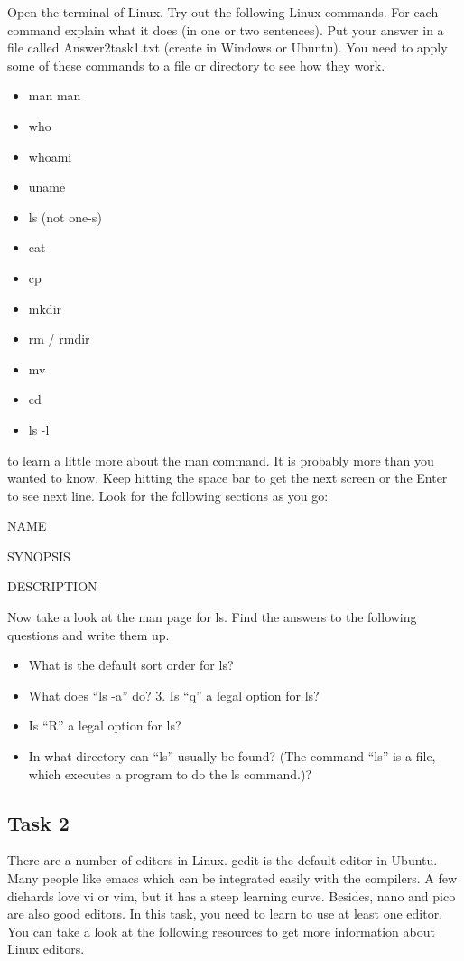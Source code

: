 \documentclass[16pt]{article}
\begin{document}
Open the terminal of Linux. Try out the following Linux commands. For each command explain what it does (in one or two sentences). Put your answer in a file called Answer2task1.txt (create in Windows or Ubuntu). You need to apply some of these commands to a file or directory to see how they work.

\begin{itemize}
\item	man man
\item	who
\item	whoami
\item	uname
\item	ls (not one-s)
\item	cat
\item	cp
\item	mkdir
\item	rm / rmdir
\item	mv
\item	cd
\item	ls -l
\end{itemize}

to learn a little more about the man command. It is probably more than you wanted to know. Keep hitting the space bar to get the next screen or the Enter to see next line. Look for the following sections as you go:

NAME

SYNOPSIS

DESCRIPTION

Now take a look at the man page for ls. Find the answers to the following questions and write them up.
\begin{itemize}
\item What is the default sort order for ls? 

\item What does ``ls -a'' do? 3. Is ``q'' a legal option for ls? 

\item Is ``R'' a legal option for ls?

\item In what directory can ``ls'' usually be found? (The command ``ls'' is a file, which executes a program to do the ls command.)?
\end{itemize}

\subsection*{Task 2}
There are a number of editors in Linux. gedit is the default editor in Ubuntu. Many people like emacs which can be integrated easily with the compilers. A few diehards love vi or vim, but it has a steep learning curve. Besides, nano and pico are also good editors. In this task, you need to learn to use at least one editor. You can take a look at the following resources to get more information about Linux editors.
\end{document}
